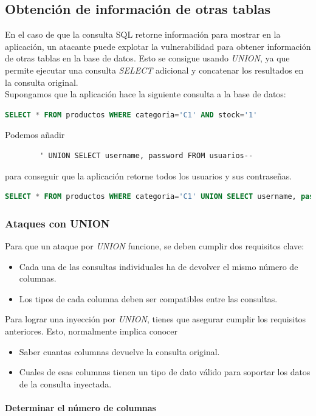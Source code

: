 \documentclass[bibliography=totocnumbered]{scrartcl}
\begin{document}
\subsection{Obtención de información de otras tablas}
En el caso de que la consulta SQL retorne información para mostrar en la aplicación, un atacante puede explotar la vulnerabilidad para obtener información de otras tablas en la base de datos. Esto se consigue usando \textit{UNION}, ya que permite ejecutar una consulta \textit{SELECT} adicional y concatenar los resultados en la consulta original.\\
Supongamos que la aplicación hace la siguiente consulta a la base de datos:
\begin{lstlisting}[language=SQL]
    SELECT * FROM productos WHERE categoria='C1' AND stock='1'
\end{lstlisting}
Podemos añadir 
\begin{lstlisting}
        ' UNION SELECT username, password FROM usuarios--
\end{lstlisting}
para conseguir que la aplicación retorne todos los usuarios y sus contraseñas.
\begin{lstlisting}[language=SQL]
SELECT * FROM productos WHERE categoria='C1' UNION SELECT username, password FROM usuarios-- AND stock='1'
\end{lstlisting}
\subsubsection{Ataques con UNION}
Para que un ataque por \textit{UNION} funcione, se deben cumplir dos requisitos clave:
\begin{itemize}
    \item Cada una de las consultas individuales ha de devolver el mismo número de columnas.
    \item Los tipos de cada columna deben ser compatibles entre las consultas.
\end{itemize}
Para lograr una inyección por \textit{UNION}, tienes que asegurar cumplir los requisitos anteriores. Esto, normalmente implica conocer
\begin{itemize}
    \item Saber cuantas columnas devuelve la consulta original.
    \item Cuales de esas columnas tienen un tipo de dato válido para soportar los datos de la consulta inyectada.
\end{itemize}
\paragraph{Determinar el número de columnas} 
\mbox{}
\end{document}

